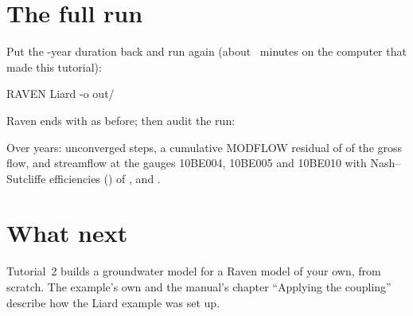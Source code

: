 \section{The full run}
Put the -year duration back and run again (about ~minutes on the computer that made this tutorial):
\begin{shell}
$ $RAVEN Liard -o out/
\end{shell}
Raven ends with  as before; then audit the run:
\begin{tocheck}
Over  years:  unconverged steps, a cumulative MODFLOW residual of  of the gross flow, and
streamflow at the gauges 10BE004, 10BE005 and 10BE010 with Nash--Sutcliffe efficiencies () of
,  and .
\end{tocheck}

\section{What next}
Tutorial~2 builds a groundwater model for a Raven model of your own, from scratch. The example's own  and
the manual's chapter ``Applying the coupling'' describe how the Liard example was set up.
